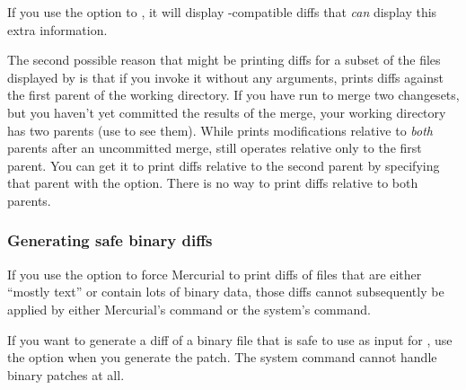 If you use the  option to , it will
display -compatible diffs that \emph{can} display this
extra information.

The second possible reason that  might be printing diffs
for a subset of the files displayed by  is that if you
invoke it without any arguments,  prints diffs against the
first parent of the working directory.  If you have run 
to merge two changesets, but you haven't yet committed the results of
the merge, your working directory has two parents (use 
to see them).  While  prints modifications relative to
\emph{both} parents after an uncommitted merge,  still
operates relative only to the first parent.  You can get it to print
diffs relative to the second parent by specifying that parent with the
 option.  There is no way to print diffs relative to
both parents.

\subsubsection{Generating safe binary diffs}

If you use the  option to force Mercurial to print
diffs of files that are either ``mostly text'' or contain lots of
binary data, those diffs cannot subsequently be applied by either
Mercurial's  command or the system's 
command.  

If you want to generate a diff of a binary file that is safe to use as
input for , use the  option when you
generate the patch.  The system  command cannot handle
binary patches at all.

